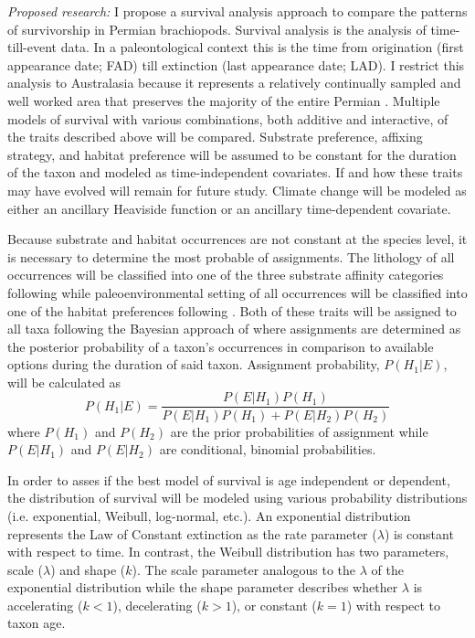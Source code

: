 \documentclass[12pt,letterpaper]{article}
\begin{document}
\textit{Proposed research:}
I propose a survival analysis approach to compare the patterns of survivorship in Permian brachiopods. Survival analysis is the analysis of time-till-event data. In a paleontological context this is the time from origination (first appearance date; FAD) till extinction (last appearance date; LAD). I restrict this analysis to Australasia because it represents a relatively continually sampled and well worked area that preserves the majority of the entire Permian \citep{Clapham2012,Clapham2008a,Waterhouse1987,Archbold1995}. Multiple models of survival with various combinations, both additive and interactive, of the traits described above will be compared. Substrate preference, affixing strategy, and habitat preference will be assumed to be constant for the duration of the taxon and modeled as time-independent covariates. If and how these traits may have evolved will remain for future study. Climate change will be modeled as either an ancillary Heaviside function or an ancillary time-dependent covariate.

Because substrate and habitat occurrences are not constant at the species level, it is necessary to determine the most probable of assignments. The lithology of all occurrences will be classified into one of the three substrate affinity categories following \citet{Foote2006} while paleoenvironmental setting of all occurrences will be classified into one of the habitat preferences following \citet{Kiessling2007}. Both of these traits will be assigned to all taxa following the Bayesian approach of \citet{Simpson2009} where assignments are determined as the posterior probability of a taxon's occurrences in comparison to available options during the duration of said taxon. Assignment probability, \(P(H_{1}|E)\), will be calculated as
\begin{equation}
  P(H_{1}|E) = \frac{P(E|H_{1})P(H_{1})}{P(E|H_{1})P(H_{1}) + P(E|H_{2})P(H_{2})}
  \label{eq:aff}
\end{equation}
where \(P(H_{1})\) and \(P(H_{2})\) are the prior probabilities of assignment while \(P(E|H_{1})\) and \(P(E|H_{2})\) are conditional, binomial probabilities. 

In order to asses if the best model of survival is age independent or dependent, the distribution of survival will be modeled using various probability distributions (i.e. exponential, Weibull, log-normal, etc.). An exponential distribution represents the Law of Constant extinction as the rate parameter (\(\lambda\)) is constant with respect to time. In contrast, the Weibull distribution has two parameters, scale (\(\lambda\)) and shape (\(k\)). The scale parameter analogous to the \(\lambda\) of the exponential distribution while the shape parameter describes whether \(\lambda\) is accelerating (\(k < 1\)), decelerating (\(k > 1\)), or constant (\(k = 1\)) with respect to taxon age.
\end{document}
